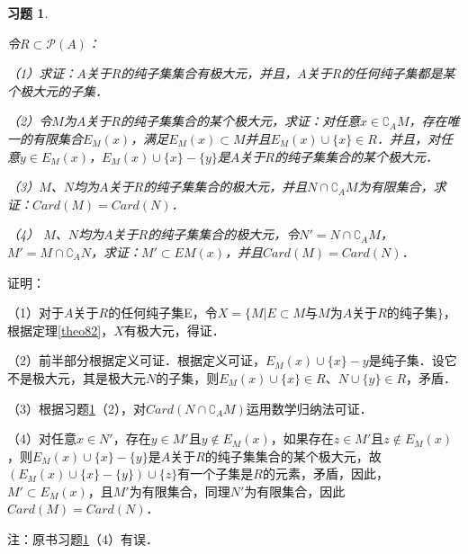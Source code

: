 \documentclass[12pt, a4paper, oneside]{book}
\newtheorem{exer}{习题}
\begin{document}
			\begin{exer}\label{exer137}
				\hfill\par
				令$R\subset \mathcal{P}(A)$：
				\par
				（1）求证：$A$关于$R$的纯子集集合有极大元，并且，$A$关于$R$的任何纯子集都是某个极大元的子集．
				\par
				（2）令$M$为$A$关于$R$的纯子集集合的某个极大元，求证：对任意$x\in \complement_AM$，存在唯一的有限集合$E_M(x)$，满足$E_M(x)\subset M$并且$E_M(x)\cup\{x\}\in R$．并且，对任意$y\in E_M(x)$，$E_M(x)\cup\{x\}-\{y\}$是$A$关于$R$的纯子集集合的某个极大元．
				\par
				（3）$M$、$N$均为$A$关于$R$的纯子集集合的极大元，并且$N\cap\complement_AM$为有限集合，求证：$Card(M)=Card(N)$．
				\par
				（4）	$M$、$N$均为$A$关于$R$的纯子集集合的极大元，令$N'=N\cap\complement_AM$，$M'=M\cap\complement_AN$，求证：$M'\subset EM(x)$，并且$Card(M)=Card(N)$．
			\end{exer}
			证明：
			\par
			（1）对于$A$关于$R$的任何纯子集E，令$X=\{M|E\subset M\text{与}M\text{为}A\text{关于}R\text{的纯子集}\}$，根据定理\ref{theo82}，$X$有极大元，得证．
			\par
			（2）前半部分根据定义可证．根据定义可证，$E_M(x)\cup\{x\}-y$是纯子集．设它不是极大元，其是极大元$N$的子集，则$E_M(x)\cup\{x\}\in R$、$N\cup\{y\}\in R$，矛盾．
			\par
			（3）根据习题\ref{exer137}（2），对$Card(N\cap\complement_AM)$运用数学归纳法可证．
			\par
			（4）对任意$x\in N'$，存在$y\in M'$且$y\notin E_M(x)$，如果存在$z\in M'$且$z\notin E_M(x)$，则$E_M(x)\cup\{x\}-\{y\}$是$A$关于$R$的纯子集集合的某个极大元，故$(E_M(x)\cup\{x\}-\{y\})\cup\{z\}$有一个子集是$R$的元素，矛盾，因此，$M'\subset E_M(x)$，且$M'$为有限集合，同理$N'$为有限集合，因此$Card(M)=Card(N)$．
			\par
			注：原书习题\ref{exer137}（4）有误．
\end{document}

